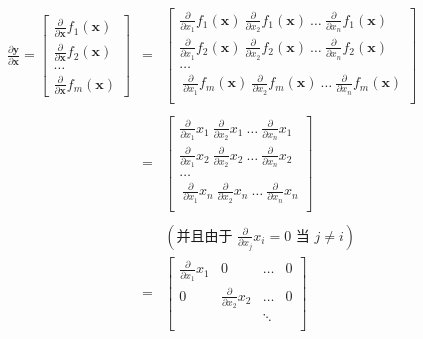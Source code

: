 \documentclass[11pt]{article}
\begin{document}
\begin{center}

\begin{eqnarray*}
	\frac{\partial \mathbf{y}}{\partial \mathbf{x}} = \begin{bmatrix}
	\frac{\partial}{\partial \mathbf{x}} f_1(\mathbf{x}) \\
	\frac{\partial}{\partial \mathbf{x}} f_2(\mathbf{x})\\
	\ldots\\
	\frac{\partial}{\partial \mathbf{x}} f_m(\mathbf{x})
	\end{bmatrix} &=& \begin{bmatrix}
	\frac{\partial}{\partial {x_1}} f_1(\mathbf{x})~ \frac{\partial}{\partial {x_2}} f_1(\mathbf{x}) ~\ldots~  \frac{\partial}{\partial {x_n}} f_1(\mathbf{x}) \\
	\frac{\partial}{\partial {x_1}} f_2(\mathbf{x})~ \frac{\partial}{\partial {x_2}} f_2(\mathbf{x}) ~\ldots~  \frac{\partial}{\partial {x_n}} f_2(\mathbf{x}) \\
	\ldots\\
	~\frac{\partial}{\partial {x_1}} f_m(\mathbf{x})~ \frac{\partial}{\partial {x_2}} f_m(\mathbf{x}) ~\ldots~ \frac{\partial}{\partial {x_n}} f_m(\mathbf{x}) \\
	\end{bmatrix}\\\\
	& = & \begin{bmatrix}
	\frac{\partial}{\partial {x_1}} x_1~ \frac{\partial}{\partial {x_2}} x_1 ~\ldots~ \frac{\partial}{\partial {x_n}} x_1 \\
	\frac{\partial}{\partial {x_1}} x_2~ \frac{\partial}{\partial {x_2}} x_2 ~\ldots~ \frac{\partial}{\partial {x_n}} x_2 \\
	\ldots\\
	~\frac{\partial}{\partial {x_1}} x_n~ \frac{\partial}{\partial {x_2}} x_n ~\ldots~ \frac{\partial}{\partial {x_n}} x_n \\
	\end{bmatrix}\\\\
	& & (\text{并且由于 } \frac{\partial}{\partial {x_j}} x_i = 0 \text{ 当 } j \neq i)\\
	 & = & \begin{bmatrix}
	\frac{\partial}{\partial {x_1}} x_1 & 0 & \ldots& 0 \\
	0 & \frac{\partial}{\partial {x_2}} x_2 &\ldots & 0 \\
	& & \ddots\\

\end{bmatrix}
\end{eqnarray*}
\end{center}
\end{document}
